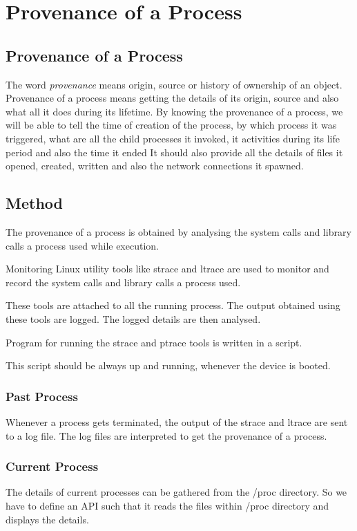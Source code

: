 \documentclass[12pt]{report}
\begin{document}
\chapter{Provenance of a Process}
	
	\section{Provenance of a Process}
	        The word \textit{provenance} means origin, source or history of ownership of an object.
		Provenance of a process means getting the details of its origin, source and also what all it does during its lifetime.
                By knowing the provenance of a process, we will be able to tell the time of creation of the process, by which process it was triggered, what are all the child processes it invoked, it activities during its life period and also the time it ended
		It should also provide all the details of files it opened, created, written and also the network connections it spawned.
	
	\section{Method}
	The provenance of a process is obtained by analysing the system calls and library calls a process used while execution.
	
	Monitoring Linux utility tools like strace and ltrace are used to monitor and record the system calls and library calls a process used.
  
    These tools are attached to all the running process. 
    The output obtained using these tools are logged. The logged details are then analysed.
    
    Program for running the strace and ptrace tools is written in a script.
	
	This script should be always up and running, whenever the device is booted.
	
	\subsection{Past Process}
	Whenever a process gets terminated, the output of the strace and ltrace are sent to a log file. The log files are interpreted to get the provenance of a process.
	
	\subsection{Current Process}
	The details of current processes can be gathered from the /proc directory. So we have to define an API such that it reads the files within /proc directory and displays the details.
	
\end{document}
